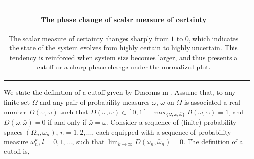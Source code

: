 \documentclass[landscape,a0b,final]{a0poster}
\newenvironment{poster}{
  \begin{center}
  \begin{minipage}[c]{0.98\textwidth}
}{
  \end{minipage} 
  \end{center}
}
\newenvironment{pcolumn}[1]{
  \begin{minipage}{#1\textwidth}
  \begin{center}
}{
  \end{center}
  \end{minipage}
}
\newcommand{\pbox}[4]{
\psshadowbox[#3]{
\begin{minipage}[t][#2][t]{#1}
#4
\end{minipage}
}}
\begin{document}
\begin{poster}
\begin{center}
\begin{pcolumn}{0.32}
{\begin{tabular}{c|l}
\begin{minipage}[b]{0.43\hsize}
  \paragraph{The phase change of scalar measure of certainty}
  The scalar measure of certainty changes sharply from $1$ to $0$, which indicates the state of the system evolves from highly certain to highly uncertain. This tendency is reinforced when system size becomes larger, and thus presents a cutoff or a sharp phase change under the normalized plot.   
  \end{minipage}
\end{tabular}





\vspace{0.7cm}\begin{center}\pbox{0.8\textwidth}{}{linewidth=2mm,framearc=0.1,linecolor=red,fillstyle=gradient,gradangle=0,gradbegin=white,gradend=whitered,gradmidpoint=1.0,framesep=1em}{\begin{center}\bfseries{\large{Cutoff Phenomenon}}\end{center}}\end{center}\vspace{1cm}

We state the definition of a cutoff given by Diaconis in
\cite{Diaconis2005}. Assume that, to any finite set $\Omega$ and any
pair of probability measures $\omega$, $\bar{\omega}$ on $\Omega$ is associated
a real number $D(\omega,\bar{\omega})$ such that $D(\omega,\bar{\omega})\in [0,1]$,
$\max_{\{\Omega,\omega,\bar{\omega}\}} D(\omega,\bar{\omega}) = 1$, 
and $D(\omega,\bar{\omega})=0$ if and only if $\bar{\omega}=\omega$. Consider a sequence of
(finite) probability spaces $(\Omega_n,\bar{\omega}_n)$, $n=1,2,...$, each
equipped with a sequence of probability measure $\omega^k_n$,
$l=0,1,...$, such that
$\lim_{k \rightarrow \infty} D(\omega_n,\bar{\omega}_n)=0$.
The definition of a cutoff is,

}
\end{pcolumn}
\end{center}
\end{poster}
\end{document}
